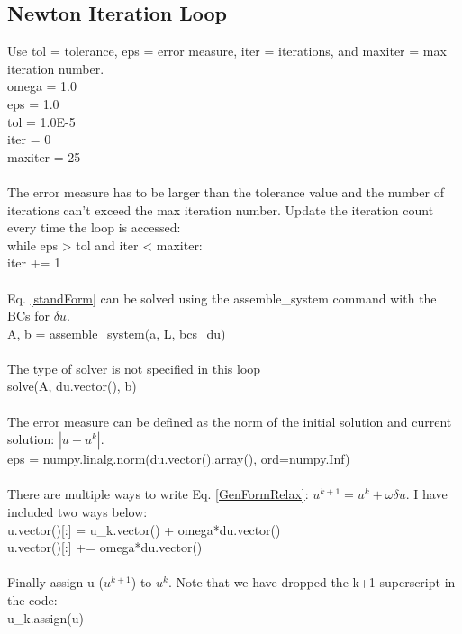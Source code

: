 \documentclass[12pt,3p]{article}
\begin{document}
\subsection{Newton Iteration Loop}
Use tol = tolerance, eps = error measure, iter =  iterations, and maxiter =  max iteration number. \\
{\selectfont  
omega = 1.0 \\       
eps = 1.0 \\         
tol = 1.0E-5 \\      
iter = 0 \\         
maxiter = 25 \\ \\
}
The error measure has to be larger than the tolerance value and the number of iterations can't exceed the max iteration number. Update the iteration count every time the loop is accessed: \\ 
{\selectfont
while eps > tol and iter < maxiter: \\
\indent iter += 1 \\ \\
}
Eq. \ref{standForm} can be solved using the {\selectfont assemble\_system} command with the BCs for $\delta u$. \\
{\selectfont
\indent  A, b = assemble\_system(a, L, bcs\_du) \\ \\
}
The type of solver is not specified in this loop \\ 
{\selectfont
\indent solve(A, du.vector(), b) \\ \\
}
The error measure can be defined as the norm of the initial solution and current solution: $|u - u^k|$.\\
{\selectfont
\indent eps = numpy.linalg.norm(du.vector().array(), ord=numpy.Inf) \\ \\
}
There are multiple ways to write Eq. \ref{GenFormRelax}: $u^{k+1} = u^k + \omega \delta u$. I have included two ways below: \\
{\selectfont
\indent u.vector()[:] = u\_k.vector() + omega*du.vector() \\
\indent u.vector()[:] += omega*du.vector() \\ \\
} 
Finally assign u ($u^{k+1}$) to $u^k$. Note that we have dropped the k+1 superscript in the code: \\ 
{\selectfont
\indent u\_k.assign(u)
}
\end{document}
